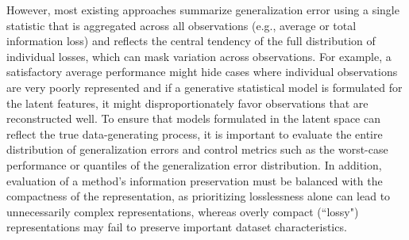 However, most existing approaches summarize generalization error using a single statistic that is aggregated across all observations (e.g., average or total information loss) and reflects the central tendency of the full distribution of individual losses, which can mask variation across observations.
For example, a satisfactory average performance might hide cases where individual observations are very poorly represented and if a generative statistical model is formulated for the latent features, it might disproportionately favor observations that are reconstructed well.
To ensure that models formulated in the latent space can reflect the true data-generating process, it is important to evaluate the entire distribution of generalization errors and control metrics such as the worst-case performance or quantiles of the generalization error distribution.
In addition, evaluation of a method's information preservation must be balanced with the compactness of the representation, as prioritizing losslessness alone can lead to unnecessarily complex representations, whereas overly compact (``lossy") representations may fail to preserve important dataset characteristics.


